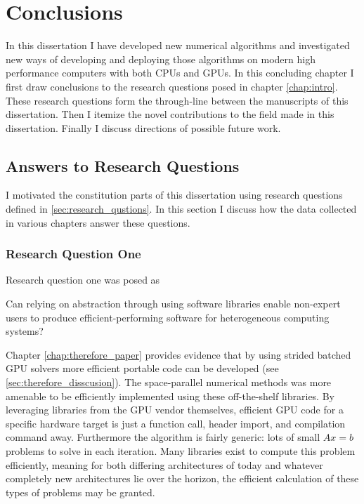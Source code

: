 
\chapter{Conclusions}
\label{chap:conclusion}


In this dissertation I have developed new numerical algorithms and investigated new ways of developing and deploying those algorithms on modern high performance computers with both CPUs and GPUs.
In this concluding chapter I first draw conclusions to the research questions posed in chapter \ref{chap:intro}.
These research questions form the through-line between the manuscripts of this dissertation.
Then I itemize the novel contributions to the field made in this dissertation.
Finally I discuss directions of possible future work.

\section{Answers to Research Questions}

I motivated the constitution parts of this dissertation using research questions defined in \ref{sec:research_qustions}.
In this section I discuss how the data collected in various chapters answer these questions.

\subsection{Research Question One}

Research question one was posed as
\begin{displayquote}
Can relying on abstraction through using software libraries enable non-expert users to produce efficient-performing software for heterogeneous computing systems?
\end{displayquote}

Chapter \ref{chap:therefore_paper} provides evidence that by using strided batched GPU solvers more efficient portable code can be developed (see \ref{sec:therefore_disscusion}).
The space-parallel numerical methods was more amenable to be efficiently implemented using these off-the-shelf libraries.
By leveraging libraries from the GPU vendor themselves, efficient GPU code for a specific hardware target is just a function call, header import, and compilation command away.
Furthermore the algorithm is fairly generic: lots of small $Ax=b$ problems to solve in each iteration.
Many libraries exist to compute this problem efficiently, meaning for both differing architectures of today and whatever completely new architectures lie over the horizon, the efficient calculation of these types of problems may be granted.

